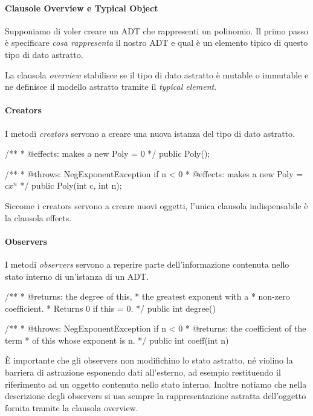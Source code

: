 \paragraph{Clausole Overview e Typical Object}
Supponiamo di voler creare un ADT che rappresenti un polinomio. Il primo passo è specificare \emph{cosa rappresenta} il nostro ADT e qual è un elemento tipico di questo tipo di dato astratto.
\begin{Java}
    /**
      * A Poly is an immutable polynomial with integer coefficient.
      * A typical element is 
      *          $c_0 + c_1x + c_2x^2 + \dots$  
      */
    public class Poly { ...
\end{Java}
La clausola \emph{overview} stabilisce se il tipo di dato astratto è mutable o immutable e ne definisce il modello astratto tramite il \emph{typical element}.

\paragraph{Creators}
I metodi \emph{creators} servono a creare una nuova istanza del tipo di dato astratto.
\begin{Java}
    /**
     * @effects: makes a new Poly = 0
     */
    public Poly();

    /**
     * @throws: NegExponentException if n < 0
     * @effects: makes a new Poly = $cx^n$
     */
    public Poly(int c, int n);
\end{Java}
Siccome i creators servono a creare nuovi oggetti, l'unica clausola indispensabile è la clausola effects.

\paragraph{Observers}
I metodi \emph{observers} servono a reperire parte dell'informazione contenuta nello stato interno di un'istanza di un ADT.
\begin{Java}
    /**
     * @returns: the degree of this,
     *      the greatest exponent with a
     *      non-zero coefficient.
     *      Returns 0 if this = 0. 
     */
    public int degree() { }

    /**
     * @throws: NegExponentException if n < 0
     * @returns: the coefficient of the term
     *      of this whose exponent is n.
     */
    public int coeff(int n) { }
\end{Java}
È importante che gli observers non modifichino lo stato astratto, né violino la barriera di astrazione esponendo dati all'esterno, ad esempio restituendo il riferimento ad un oggetto contenuto nello stato interno. Inoltre notiamo che nella descrizione degli observers si usa sempre la rappresentazione astratta dell'oggetto fornita tramite la clausola overview.

